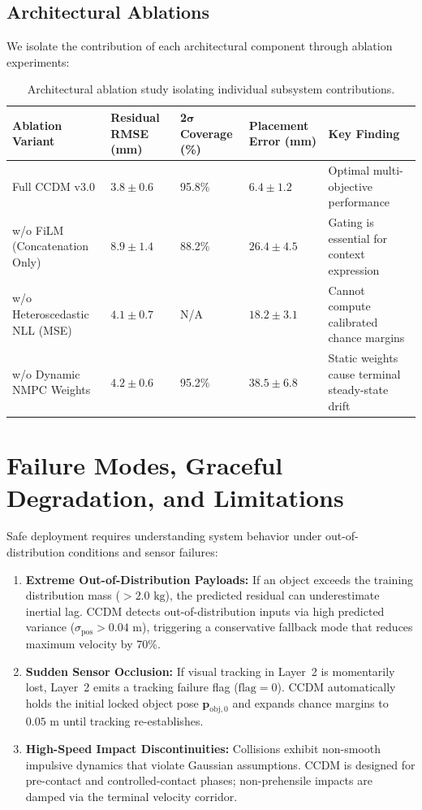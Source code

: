 \documentclass[10pt,a4paper]{article}
\begin{document}
\subsection{Architectural Ablations}
We isolate the contribution of each architectural component through ablation experiments:

\begin{table}[h]
\centering
\small
\begin{tabularx}{\linewidth}{p{3.8cm}p{2.4cm}p{2.2cm}p{2.4cm}X}
\toprule
\textbf{Ablation Variant} & \textbf{Residual RMSE (mm)} & \textbf{2$\bm{\sigma}$ Coverage (\%)} & \textbf{Placement Error (mm)} & \textbf{Key Finding} \\
\midrule
Full CCDM v3.0 & $3.8 \pm 0.6$ & 95.8\% & $6.4 \pm 1.2$ & Optimal multi-objective performance \\
w/o FiLM (Concatenation Only) & $8.9 \pm 1.4$ & 88.2\% & $26.4 \pm 4.5$ & Gating is essential for context expression \\
w/o Heteroscedastic NLL (MSE) & $4.1 \pm 0.7$ & N/A & $18.2 \pm 3.1$ & Cannot compute calibrated chance margins \\
w/o Dynamic NMPC Weights & $4.2 \pm 0.6$ & 95.2\% & $38.5 \pm 6.8$ & Static weights cause terminal steady-state drift \\
\bottomrule
\end{tabularx}
\caption{Architectural ablation study isolating individual subsystem contributions.}
\label{tab:ablations}
\end{table}

\newpage

\section{Failure Modes, Graceful Degradation, and Limitations}
Safe deployment requires understanding system behavior under out-of-distribution conditions and sensor failures:
\begin{enumerate}
    \item \textbf{Extreme Out-of-Distribution Payloads:} If an object exceeds the training distribution mass ($> 2.0\text{ kg}$), the predicted residual can underestimate inertial lag. CCDM detects out-of-distribution inputs via high predicted variance ($\sigma_{\mathrm{pos}} > 0.04\text{ m}$), triggering a conservative fallback mode that reduces maximum velocity by 70\%.
    \item \textbf{Sudden Sensor Occlusion:} If visual tracking in Layer~2 is momentarily lost, Layer~2 emits a tracking failure flag ($\mathrm{flag} = 0$). CCDM automatically holds the initial locked object pose $\mathbf{p}_{\mathrm{obj},0}$ and expands chance margins to $0.05\text{ m}$ until tracking re-establishes.
    \item \textbf{High-Speed Impact Discontinuities:} Collisions exhibit non-smooth impulsive dynamics that violate Gaussian assumptions. CCDM is designed for pre-contact and controlled-contact phases; non-prehensile impacts are damped via the terminal velocity corridor.
\end{enumerate}
\end{document}
